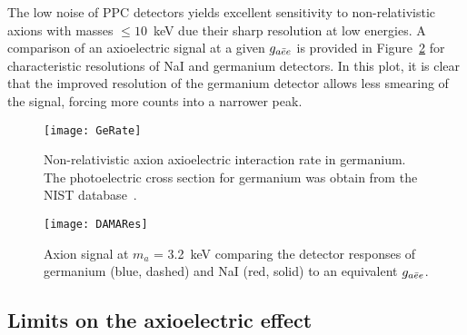 The low noise of PPC detectors yields excellent sensitivity to non-relativistic axions with masses $\leq10$~keV due their sharp resolution at low energies.  A comparison of an axioelectric signal at a given $g_{a\bar{e}e}$ is provided in Figure~\ref{fig:ResCompare} for characteristic resolutions of NaI and germanium detectors.  In this plot, it is clear that the improved resolution of the germanium detector allows less smearing of the signal, forcing more counts into a narrower peak.

		\begin{figure}
			\centering
			\texttt{[image: GeRate]}
			\caption[Axioelectric interaction rate in germanium]{Non-relativistic axion axioelectric 
			interaction rate in germanium.  The photoelectric cross section for germanium was obtain
			from the NIST database~\cite{chantler:597}.}
			\label{fig:HeavyAxionSignalRate}
		\end{figure}

		\begin{figure}
			\centering
			\texttt{[image: DAMARes]}
			\caption[Axion signal at $m_{a}$ = 3.2~keV]{Axion signal at $m_{a}$ = 3.2~keV comparing 
			the detector responses of germanium (blue, dashed) and NaI (red, solid) to an equivalent
			$g_{a\bar{e}e}$.  }
			\label{fig:ResCompare}
		\end{figure}

	\subsection{Limits on the axioelectric effect}
	\label{sec:CalcLimitsOnHeavyAxionLimits}		
		
